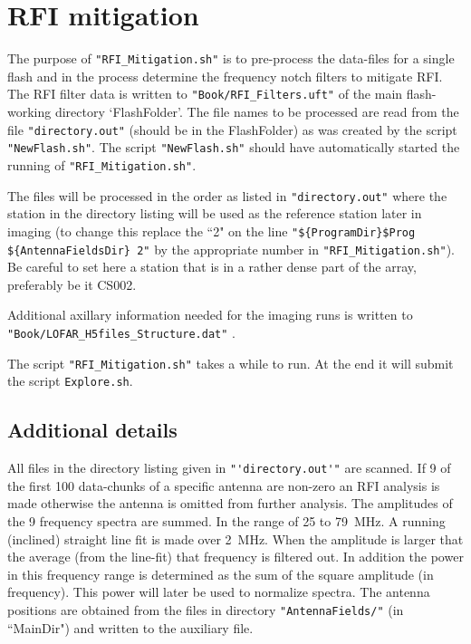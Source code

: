 
\section{RFI mitigation}

The purpose of \verb!"RFI_Mitigation.sh"! is to pre-process the data-files for a single flash and in the process determine the frequency notch filters to mitigate RFI. The RFI filter data is written to \verb!"Book/RFI_Filters.uft"! of the main flash-working directory `FlashFolder'. The file names to be processed are read from the file \verb!"directory.out"! (should be in the FlashFolder) as was created by the script \verb!"NewFlash.sh"!. The script \verb!"NewFlash.sh"! should have automatically started the running of \verb!"RFI_Mitigation.sh"!.


The files will be processed in the order as listed in \verb!"directory.out"!
where the  station in the directory listing will be used as the reference station later in imaging (to change this replace the ``2" on the line \verb!"${ProgramDir}$Prog ${AntennaFieldsDir} 2"! by the appropriate number in \verb!"RFI_Mitigation.sh"!). Be careful to set here a station that is in a rather dense part of the array, preferably be it  CS002.

Additional axillary information needed for the imaging runs is written to\\ \verb!"Book/LOFAR_H5files_Structure.dat"! .

The script \verb!"RFI_Mitigation.sh"! takes a while to run. At the end it will submit the script \verb!Explore.sh!.


\subsection{Additional details}

All files in the directory listing given in \verb!"'directory.out'"! are scanned. If 9 of the first 100 data-chunks of a specific antenna are non-zero an RFI analysis is made otherwise the antenna is omitted from further analysis. The amplitudes of the 9 frequency spectra are summed. In the range of 25 to 79~MHz. A running (inclined) straight line fit is made over 2~MHz. When the amplitude is larger that the average (from the line-fit) that frequency is filtered out. In addition the power in this frequency range is determined as the sum of the square amplitude (in frequency). This power will later be used to normalize spectra. The antenna positions are obtained from the files in directory \verb!"AntennaFields/"! (in ``MainDir") and written to the auxiliary file.

